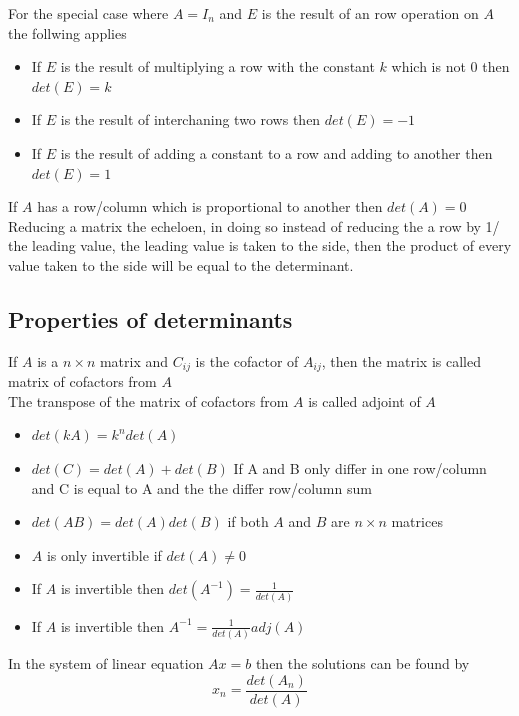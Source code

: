\documentclass[12pt, a4paper]{article}
\begin{document}
			For the special case where $A=I_n$ and $E$ is the result of an row operation on $A$ the follwing applies
			\begin{itemize}
				\item If $E$ is the result of multiplying a row with the constant $k$ which is not 0 then $det(E)=k$
				\item If $E$ is the result of interchaning two rows then $det(E)=-1$
				\item If $E$ is the result of adding a constant to a row and adding to another then $det(E)=1$
			\end{itemize}
			If $A$ has a row/column which is proportional to another then $det(A)=0$\\
			Reducing a matrix the echeloen, in doing so instead of reducing the a row by 1/ the leading value, the leading value is taken to the side, then the product of every value taken to the side will be equal to the determinant.\\
		\subsection{Properties of determinants}
			If $A$ is a $n\times n$ matrix and $C_{ij}$ is the cofactor of $A_{ij}$, then the matrix is called matrix of cofactors from $A$\\
			The transpose of the matrix of cofactors from $A$ is called adjoint of $A$
			\begin{itemize}
				\item $det(kA)=k^ndet(A)$
				\item $det(C)=det(A)+det(B)$  If A and B only differ in one row/column and C is equal to A and the the differ row/column sum
				\item $det(AB)=det(A)det(B)$ if both $A$ and $B$ are $n\times n$ matrices
				\item $A$ is only invertible if $det(A)\neq 0$
				\item If $A$ is invertible then $det(A^{-1})=\frac{1}{det(A)}$
				\item If $A$ is invertible then $A^{-1}=\frac{1}{det(A)}adj(A)$
			\end{itemize}
			In the system of linear equation $Ax=b$ then the solutions can be found by
			$$x_n=\frac{det(A_n)}{det(A)}$$
\end{document}
